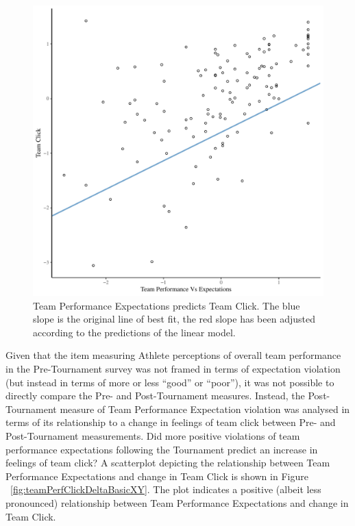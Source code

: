 \begin{CJK}{UTF8}{gbsn}
  \begin{figure}[htbp]
    \centering
  \includegraphics[scale=.5]{images/teamPerfClickModelSlope.pdf}
    \caption{Team Performance Expectations predicts Team Click. The blue slope is the original line of best fit, the red slope has been adjusted according to the predictions of the linear model.}
    \label{fig:teamPerfClickModelSlope}
  \end{figure}



Given that the item measuring Athlete perceptions of overall team performance in the Pre-Tournament survey was not framed in terms of expectation violation (but instead in terms of more or less ``good'' or ``poor''), it was not possible to directly compare the Pre- and Post-Tournament measures.  Instead, the Post-Tournament measure of Team Performance Expectation violation was analysed in terms of its relationship to a change in feelings of team click between Pre- and Post-Tournament measurements. Did more positive violations of team performance expectations following the Tournament predict an increase in feelings of team click? A scatterplot depicting the relationship between Team Performance Expectations and change in Team Click is shown in Figure ~\ref{fig:teamPerfClickDeltaBasicXY}. The plot indicates a positive (albeit less pronounced) relationship between Team Performance Expectations and change in Team Click.


\end{CJK}
